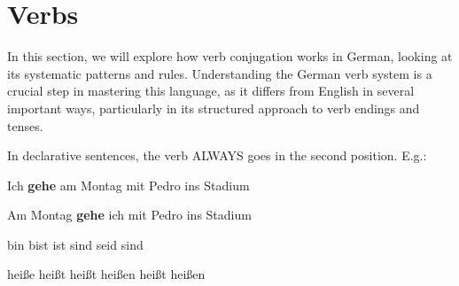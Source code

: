 \section{Verbs}\label{sec:verbs}

In this section, we will explore how verb conjugation works in German, looking at its systematic patterns and rules. Understanding the German verb system is a crucial step in mastering this language, as it differs from English in several important ways, particularly in its structured approach to verb endings and tenses.

In declarative sentences, the verb ALWAYS goes in the second position. E.g.:

\begin{center}
    Ich \textbf{gehe} am Montag mit Pedro ins Stadium

    Am Montag \textbf{gehe} ich mit Pedro ins Stadium
\end{center}

{bin}
{bist}
{ist}
{sind}
{seid}
{sind}

{hei\ss{}e}
{hei\ss{}t}
{hei\ss{}t}
{hei\ss{}en}
{hei\ss{}t}
{hei\ss{}en}